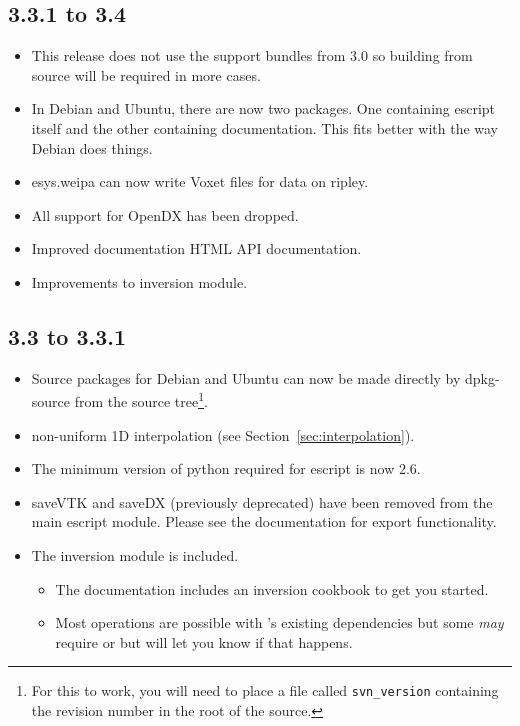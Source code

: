\subsection*{3.3.1 to 3.4}
\begin{itemize}
 \item This release does not use the support bundles from $3.0$ so building from source will be required in more cases.
 \item In Debian and Ubuntu, there are now two packages. One containing escript itself and the other containing documentation.
This fits better with the way Debian does things.
 \item esys.weipa can now write Voxet files for data on ripley.
 \item All support for OpenDX has been dropped.
 \item Improved documentation HTML API documentation.
 \item Improvements to inversion module. 
\end{itemize}


\subsection*{3.3 to 3.3.1}
\begin{itemize}
 \item Source packages for Debian and Ubuntu can now be made directly by dpkg-source from the source tree\footnote{For this to work, you will need to place a file called \texttt{svn_version} containing the revision number in the root of the source.}.
 \item non-uniform 1D interpolation (see Section~\ref{sec:interpolation}).
 \item The minimum version of python required for escript is now $2.6$.
 \item saveVTK and saveDX (previously deprecated) have been removed from the main escript module.
Please see the  documentation for export functionality.
 \item The  inversion module is included.
\begin{itemize}
 \item The documentation includes an inversion cookbook to get you started.
 \item Most operations are possible with \escript's existing dependencies but some \emph{may} require  or 
  but \escript will let you know if that happens.
\end{itemize}
 
\end{itemize}


